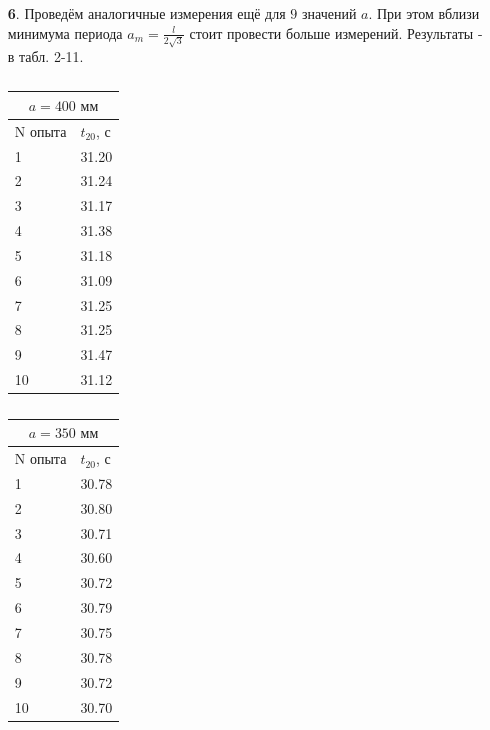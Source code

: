 \documentclass[a4paper]{article}
\begin{document}
\begin{itemize}
\item[\textbf{6}.] Проведём аналогичные измерения ещё для $9$ значений $a$. При этом вблизи минимума периода $a_m = \frac{l}{2\sqrt{3}}$ стоит провести больше измерений. Результаты - в табл. 2-11.

\begin{table}
\begin{minipage}{0.32\linewidth}
\centering
\begin{tabular}{|l|l|}
\hline
\multicolumn{2}{|c|}{$a = 400 \text{ мм}$} \\
\hline
N опыта & $t_{20}$, с  \\
\hline
1       & 31.20             \\
\hline
2       & 31.24             \\
\hline
3       & 31.17             \\
\hline
4       & 31.38             \\
\hline
5       & 31.18             \\
\hline
6       & 31.09             \\
\hline
7       & 31.25             \\
\hline
8       & 31.25             \\
\hline
9       & 31.47             \\
\hline
10      & 31.12     \\
\hline       
\end{tabular}
\caption{}
\end{minipage}
\begin{minipage}{0.32\linewidth}
\centering
\begin{tabular}{|l|l|}
\hline
\multicolumn{2}{|c|}{$a = 350 \text{ мм}$} \\
\hline
N опыта & $t_{20}$, с  \\
\hline
1       &   30.78          \\
\hline
2       &   30.80             \\
\hline
3       &   30.71            \\
\hline
4       &   30.60            \\
\hline
5       &   30.72           \\
\hline
6       &   30.79             \\
\hline
7       &   30.75           \\
\hline
8       &   30.78             \\
\hline
9       &   30.72             \\
\hline
10      &   30.70    \\

\end{tabular}
\end{minipage}
\end{table}
\end{itemize}
\end{document}
